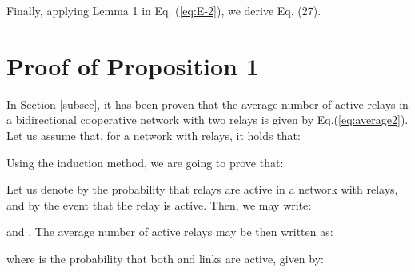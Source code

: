 \documentclass[12pt,draftcls, onecolumn]{IEEEtran}
\begin{document}
\begingroup

\endgroup

Finally, applying Lemma 1 in Eq. (\ref{eq:E-2}), we derive Eq. (27).

\section{Proof of Proposition 1}
\label{a3}

In Section \ref{subsec}, it has been proven that the average number of active relays in a bidirectional cooperative network with two relays is given by Eq.(\ref{eq:average2}). Let us assume that, for a network with  relays, it holds that:



Using the induction method, we are going to prove that:



Let us denote by  the probability that  relays are active in a network with  relays, and by  the event that the  relay is active. Then, we may write:

\begingroup

\endgroup

\noindent and . The average number of active relays may be then written as: 



\begingroup

{\setlength{\arraycolsep}{0em}}
\endgroup



\noindent where  is the probability that both  and  links are active, given by:



\ifCLASSOPTIONcaptionsoff
  \newpage
\fi




\end{document}
